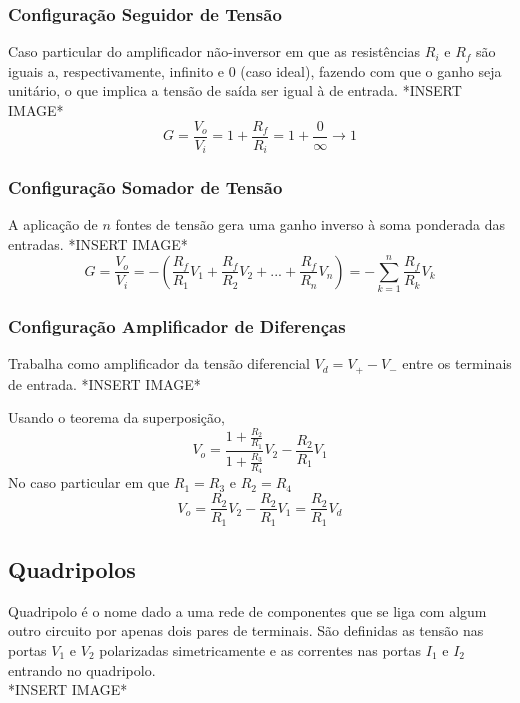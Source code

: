 \documentclass{article}
\numberwithin{equation}{section}
\begin{document}
    \subsubsection{Configuração Seguidor de Tensão}
    Caso particular do amplificador não-inversor em que as resistências $R_{i}$ e $R_{f}$ são iguais a, respectivamente, infinito e $0$ (caso ideal), fazendo com que o ganho seja unitário, o que implica a tensão de saída ser igual à de entrada.
    *INSERT IMAGE*
    \begin{equation}
        G=\frac{V_{o}}{V_{i}}=1+\frac{R_{f}}{R_{i}}=1+\frac{0}{\infty}\xrightarrow{}1
    \end{equation}

    \subsubsection{Configuração Somador de Tensão}
    A aplicação de $n$ fontes de tensão gera uma ganho inverso à soma ponderada das entradas.
    *INSERT IMAGE*
    \begin{equation}
        G=\frac{V_{o}}{V_{i}}=-(\frac{R_{f}}{R_{1}}V_{1}+\frac{R_{f}}{R_{2}}V_{2}+...+\frac{R_{f}}{R_{n}}V_{n})=-\sum_{k=1}^{n}\frac{R_{f}}{R_{k}}V_{k}
    \end{equation}

    \subsubsection{Configuração Amplificador de Diferenças}
    Trabalha como amplificador da tensão diferencial $V_{d}=V_{+}-V_{-}$ entre os terminais de entrada. %
    *INSERT IMAGE*

    Usando o teorema da superposição,
    \begin{equation*}
        V_{o}=\frac{1+\displaystyle\frac{R_{2}}{R_{1}}}{1+\displaystyle\frac{R_{3}}{R_{4}}}V_{2} - \displaystyle\frac{R_{2}}{R_{1}}V_{1}
    \end{equation*}
    No caso particular em que $R_{1}=R_{3}$ e $R_{2}=R_{4}$
    \begin{equation}
        V_{o}=\frac{R_{2}}{R_{1}}V_{2}-\frac{R_{2}}{R_{1}}V_{1}=\frac{R_{2}}{R_{1}}V_{d}
    \end{equation}

    \subsection{Quadripolos}
    \label{subsec:quadripolos}
    Quadripolo é o nome dado a uma rede de componentes que se liga com algum outro circuito por apenas dois pares de terminais. São definidas as tensão nas portas $V_{1}$ e $V_{2}$ polarizadas simetricamente e as correntes nas portas $I_{1}$ e $I_{2}$ entrando no quadripolo. \\
    *INSERT IMAGE*
\end{document}

